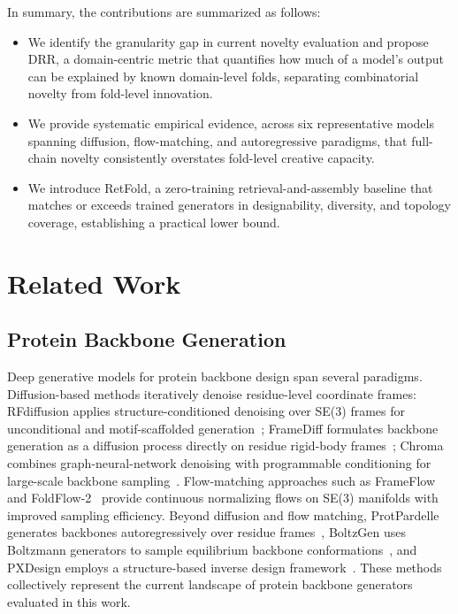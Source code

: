 \documentclass[letterpaper]{article} %
\begin{document}

In summary, the contributions are summarized as follows:
\begin{itemize}
\item We identify the granularity gap in current novelty evaluation and propose DRR, a domain-centric metric that quantifies how much of a model's output can be explained by known domain-level folds, separating combinatorial novelty from fold-level innovation.
\item We provide systematic empirical evidence, across six representative models spanning diffusion, flow-matching, and autoregressive paradigms, that full-chain novelty consistently overstates fold-level creative capacity.
\item We introduce RetFold, a zero-training retrieval-and-assembly baseline that matches or exceeds trained generators in designability, diversity, and topology coverage, establishing a practical lower bound.
\end{itemize}

\section{Related Work}

\subsection{Protein Backbone Generation}

Deep generative models for protein backbone design span several paradigms. Diffusion-based methods iteratively denoise residue-level coordinate frames: RFdiffusion applies structure-conditioned denoising over SE(3) frames for unconditional and motif-scaffolded generation~\cite{watson2023rfdiffusion}; FrameDiff formulates backbone generation as a diffusion process directly on residue rigid-body frames~\cite{yim2023framediff}; Chroma combines graph-neural-network denoising with programmable conditioning for large-scale backbone sampling~\cite{ingraham2023chroma}. Flow-matching approaches such as FrameFlow~\cite{yim2023frameflow} and FoldFlow-2~\cite{huguet2024foldflow2} provide continuous normalizing flows on SE(3) manifolds with improved sampling efficiency. Beyond diffusion and flow matching, ProtPardelle generates backbones autoregressively over residue frames~\cite{chu2024protpardelle}, BoltzGen uses Boltzmann generators to sample equilibrium backbone conformations~\cite{zheng2024boltzgen}, and PXDesign employs a structure-based inverse design framework~\cite{wang2024pxdesign}. These methods collectively represent the current landscape of protein backbone generators evaluated in this work.
\end{document}
